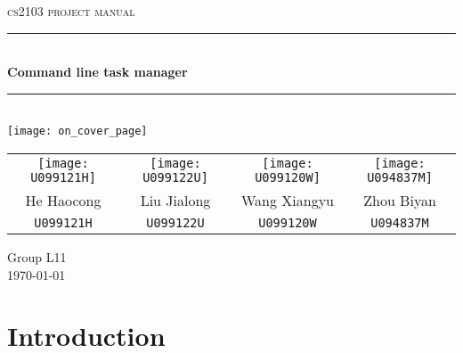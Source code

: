 \documentclass[12pt, a4paper]{article}
\begin{document}
\begin{titlepage}
  \centering

  \textsc{\LARGE cs2103 project manual}
  \\[1.5cm]
  \hrule
  \\[0.5cm]
  \Large \bfseries Command line task manager
  \\[0.4cm]
  \hrule
  \\[1.4cm]
  \texttt{[image: on\_cover\_page]}
  \\[1.1cm]

  \begin{tabular}{c | c | c | c}
    \texttt{[image: U099121H]}&
    \texttt{[image: U099122U]}&
    \texttt{[image: U099120W]}&
    \texttt{[image: U094837M]}\\

    \small{He Haocong} & \small{Liu Jialong} & \small{Wang Xiangyu} & \small{Zhou Biyan}\\
    \small{\texttt{U099121H}} & \small{\texttt{U099122U}} & \small{\texttt{U099120W}} & \small{\texttt{U094837M}}\\
  \end{tabular}

  \vfill
  {\large Group L11\\ \today}
\end{titlepage}

\tableofcontents
\newpage

\section{Introduction}

\end{document}
